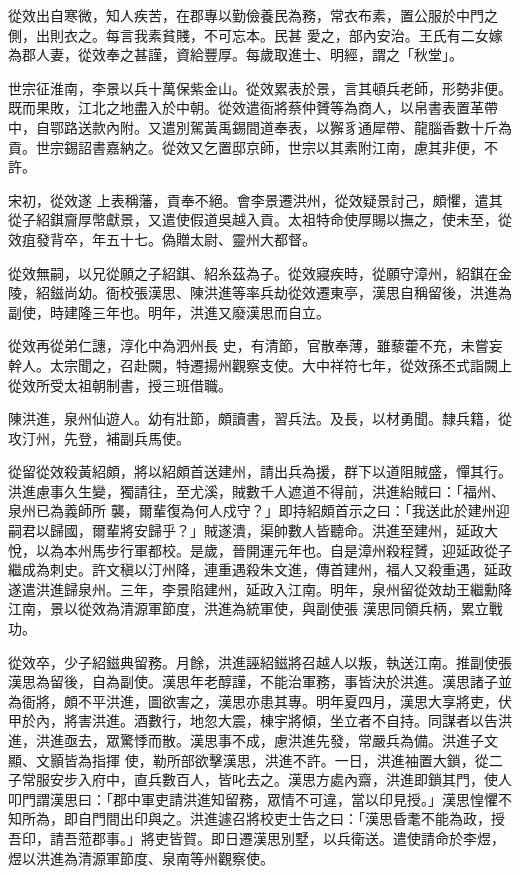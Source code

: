 \begin{pinyinscope}
 從效出自寒微，知人疾苦，在郡專以勤儉養民為務，常衣布素，置公服於中門之側，出則衣之。每言我素貧賤，不可忘本。民甚
 愛之，部內安治。王氏有二女嫁為郡人妻，從效奉之甚謹，資給豐厚。每歲取進士、明經，謂之「秋堂」。



 世宗征淮南，李景以兵十萬保紫金山。從效累表於景，言其頓兵老師，形勢非便。既而果敗，江北之地盡入於中朝。從效遣衙將蔡仲贇等為商人，以帛書表置革帶中，自鄂路送款內附。又遣別駕黃禹錫間道奉表，以獬豸通犀帶、龍腦香數十斤為貢。世宗錫詔書嘉納之。從效又乞置邸京師，世宗以其素附江南，慮其非便，不許。



 宋初，從效遂
 上表稱藩，貢奉不絕。會李景遷洪州，從效疑景討己，頗懼，遣其從子紹錤齎厚幣獻景，又遣使假道吳越入貢。太祖特命使厚賜以撫之，使未至，從效疽發背卒，年五十七。偽贈太尉、靈州大都督。



 從效無嗣，以兄從願之子紹錤、紹糸茲為子。從效寢疾時，從願守漳州，紹錤在金陵，紹鎡尚幼。衙校張漢思、陳洪進等率兵劫從效遷東亭，漢思自稱留後，洪進為副使，時建隆三年也。明年，洪進又廢漢思而自立。



 從效再從弟仁譓，淳化中為泗州長
 史，有清節，官散奉薄，雖藜藿不充，未嘗妄幹人。太宗聞之，召赴闕，特遷揚州觀察支使。大中祥符七年，從效孫丕式詣闕上從效所受太祖朝制書，授三班借職。



 陳洪進，泉州仙遊人。幼有壯節，頗讀書，習兵法。及長，以材勇聞。隸兵籍，從攻汀州，先登，補副兵馬使。



 從留從效殺黃紹頗，將以紹頗首送建州，請出兵為援，群下以道阻賊盛，憚其行。洪進慮事久生變，獨請往，至尤溪，賊數千人遮道不得前，洪進紿賊曰：「福州、泉州已為義師所
 襲，爾輩復為何人戍守？」即持紹頗首示之曰：「我送此於建州迎嗣君以歸國，爾輩將安歸乎？」賊遂潰，渠帥數人皆聽命。洪進至建州，延政大悅，以為本州馬步行軍都校。是歲，晉開運元年也。自是漳州殺程贇，迎延政從子繼成為刺史。許文稹以汀州降，連重遇殺朱文進，傳首建州，福人又殺重遇，延政遂遣洪進歸泉州。三年，李景陷建州，延政入江南。明年，泉州留從效劫王繼勳降江南，景以從效為清源軍節度，洪進為統軍使，與副使張
 漢思同領兵柄，累立戰功。



 從效卒，少子紹鎡典留務。月餘，洪進誣紹鎡將召越人以叛，執送江南。推副使張漢思為留後，自為副使。漢思年老醇謹，不能治軍務，事皆決於洪進。漢思諸子並為衙將，頗不平洪進，圖欲害之，漢思亦患其專。明年夏四月，漢思大享將吏，伏甲於內，將害洪進。酒數行，地忽大震，棟宇將傾，坐立者不自持。同謀者以告洪進，洪進亟去，眾驚悸而散。漢思事不成，慮洪進先發，常嚴兵為備。洪進子文顯、文顥皆為指揮
 使，勒所部欲擊漢思，洪進不許。一日，洪進袖置大鎖，從二子常服安步入府中，直兵數百人，皆叱去之。漢思方處內齋，洪進即鎖其門，使人叩門謂漢思曰：「郡中軍吏請洪進知留務，眾情不可違，當以印見授。」漢思惶懼不知所為，即自門間出印與之。洪進遽召將校吏士告之曰：「漢思昏耄不能為政，授吾印，請吾蒞郡事。」將吏皆賀。即日遷漢思別墅，以兵衛送。遣使請命於李煜，煜以洪進為清源軍節度、泉南等州觀察使。




\end{pinyinscope}
